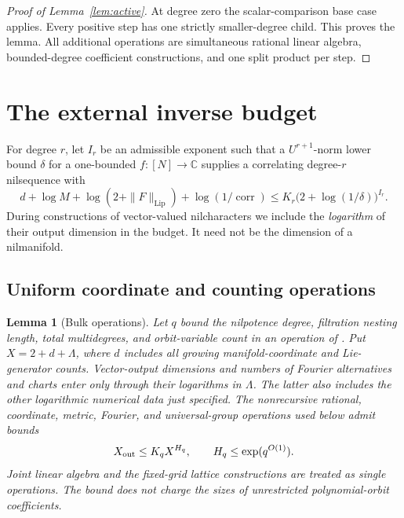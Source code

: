 \documentclass[11pt,a4paper]{article}
\newtheorem{lemma}[theorem]{Lemma}
\theoremstyle{definition}
\newcommand{\Lip}{\operatorname{Lip}}
\newcommand{\corr}{\operatorname{corr}}
\begin{document}
\begin{proof}[Proof of Lemma~\ref{lem:active}]
At degree zero the scalar-comparison base case applies.
Every positive step has one strictly smaller-degree child.
This proves the lemma. All additional operations are
simultaneous rational linear algebra, bounded-degree
coefficient constructions, and one split product per step.
\end{proof}


\section{The external inverse budget}\label{sec:inverse}\label{sec:numerical}

For degree \(r\), let \(I_r\) be an admissible exponent such that a
\(U^{r+1}\)-norm lower bound \(\delta\) for a one-bounded
\(f:[N]\to\mathbb C\) supplies a correlating
degree-\(r\) nilsequence with
\begin{equation}\label{eq:inverse-budget}
 d+\log M+\log(2+\|F\|_{\Lip})+\log(1/\corr)
 \le K_r\bigl(2+\log(1/\delta)\bigr)^{I_r}.
\end{equation}
During constructions of vector-valued nilcharacters we include the
\emph{logarithm} of their output dimension in the budget. It need not
be the dimension of a nilmanifold.

\subsection{Uniform coordinate and counting operations}

\begin{lemma}[Bulk operations]\label{lem:bulk}
Let \(q\) bound the nilpotence degree, filtration nesting length,
total multidegrees, and orbit-variable count in an operation of
\cite{leng,lss}. Put \(X=2+d+\Lambda\), where \(d\) includes all
growing manifold-coordinate and Lie-generator counts. Vector-output
dimensions and numbers of Fourier alternatives and charts enter
only through their logarithms in \(\Lambda\). The latter also includes
the other logarithmic numerical data just specified. The nonrecursive
rational, coordinate, metric, Fourier, and universal-group operations
used below admit bounds
\[
 X_{\rm out}\le K_q X^{H_q},\qquad H_q\le\exp(q^{O(1)}).
\]
Joint linear algebra and the fixed-grid lattice constructions are
treated as single operations. The bound does not charge the sizes of
unrestricted polynomial-orbit coefficients.
\end{lemma}
\end{document}
